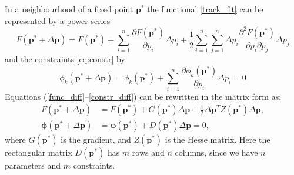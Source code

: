 
In a neighbourhood of a fixed point $\boldsymbol{p}^*$ the functional \eqref{track_fit} can be represented by a power series
\begin{equation}\label{func_diff}
F(\boldsymbol{p}^*+\Delta\boldsymbol{p}) = F(\boldsymbol{p}^*) + \sum_{i=1}^n \frac{\partial F(\boldsymbol{p}^*)}{\partial p_i} \Delta p_i + \frac{1}{2}\sum_{i=1}^n\sum_{j=1}^n \Delta p_i \frac{\partial^2 F(\boldsymbol{p}^*)}{\partial p_i \partial p_j} \Delta p_j
\end{equation}
and the constraints \eqref{eq:constr} by
\begin{equation}\label{constr_diff}
\phi_k(\boldsymbol{p}^*+\Delta\boldsymbol{p}) = \phi_k(\boldsymbol{p}^*) + \sum_{i=1}^n \frac{\partial \phi_k(\boldsymbol{p}^*)}{\partial p_i}\Delta p_i = 0
\end{equation}
Equations (\ref{func_diff}--\ref{constr_diff}) can be rewritten in the matrix form as:
\begin{align}
\label{eq_diff1}
F(\boldsymbol{p}^*+\Delta\boldsymbol{p}) &= F(\boldsymbol{p}^*) + G(\boldsymbol{p}^*) \Delta\boldsymbol{p} + \frac{1}{2}\Delta\boldsymbol{p}^T Z(\boldsymbol{p}^*) \Delta\boldsymbol{p},\\
\label{eq_diff2}
\boldsymbol{\phi}(\boldsymbol{p}^*+\Delta\boldsymbol{p}) &= \boldsymbol{\phi}(\boldsymbol{p}^*) + D(\boldsymbol{p}^*) \Delta\boldsymbol{p} = 0,
\end{align}
where $G(\boldsymbol{p}^*)$ is the gradient, and $Z(\boldsymbol{p}^*)$ is the Hesse matrix.
Here the rectangular matrix $D(\boldsymbol{p}^*)$ has $m$ rows and $n$ columns, since we have $n$ parameters and $m$ constraints.

